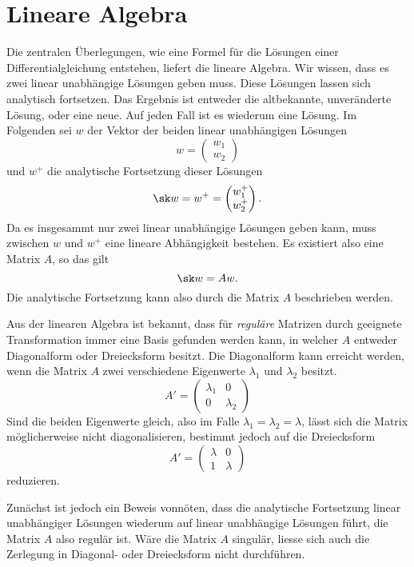 \section{Lineare Algebra}
Die zentralen Überlegungen, wie eine Formel für die Lösungen einer Differentialgleichung entstehen, liefert die lineare Algebra.
Wir wissen, dass es zwei linear unabhängige Lösungen geben muss.
Diese Lösungen lassen sich analytisch fortsetzen.
Das Ergebnis ist entweder die altbekannte, unveränderte Lösung, oder eine neue.
Auf jeden Fall ist es wiederum eine Lösung.
Im Folgenden sei $w$ der Vektor der beiden linear unabhängigen Lösungen
\[w = \begin{pmatrix} w_1 \\ w_2 \end{pmatrix} \]
und $w^+$ die analytische Fortsetzung dieser Lösungen
\[\sk w = w^+=  \begin{pmatrix}
w_1^+\\ w_2^+
\end{pmatrix}.
\]
Da es insgesammt nur zwei linear unabhängige Lösungen geben kann, muss zwischen $w$ und $w^+$ eine lineare Abhängigkeit bestehen.
Es existiert also eine Matrix $A$,
so das gilt
\[\sk w =  Aw.\]
Die analytische Fortsetzung kann also durch die Matrix $A$ beschrieben werden.

Aus der linearen Algebra ist bekannt, dass für \emph{reguläre} Matrizen durch geeignete Transformation immer eine Basis gefunden werden kann, in welcher $A$ entweder Diagonalform oder Dreiecksform besitzt.
Die Diagonalform kann erreicht werden, wenn die Matrix $A$ zwei verschiedene Eigenwerte $\lambda_1$ und $\lambda_2$ besitzt. 
\[A'=\begin{pmatrix}
\lambda_1 & 0 \\ 
0 & \lambda_2 \end{pmatrix}\]
Sind die beiden Eigenwerte gleich, also im Falle $\lambda_1=\lambda_2=\lambda$, lässt sich die Matrix möglicherweise nicht diagonalisieren, bestimmt jedoch auf die Dreiecksform
\[A'=\begin{pmatrix}\lambda & 0 \\ 1 & \lambda\end{pmatrix}\]
reduzieren.

Zunächst ist jedoch ein Beweis vonnöten, dass die analytische Fortsetzung linear unabhängiger Lösungen wiederum auf linear unabhängige Lösungen führt, die Matrix $A$ also regulär ist.
Wäre die Matrix $A$ singulär, liesse sich auch die Zerlegung in Diagonal- oder Dreiecksform nicht durchführen. 

